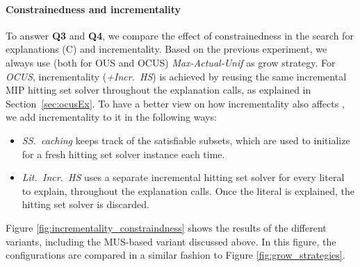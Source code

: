 \paragraph{Constrainedness and incrementality}
To answer \textbf{Q3} and \textbf{Q4}, we compare the effect of constrainedness in the search for explanations (C) and incrementality. Based on the previous experiment, we always use (both for OUS and OCUS) \emph{Max-Actual-Unif} as grow strategy.
For \emph{OCUS}, incrementality (\emph{+Incr.~HS}) is achieved by reusing the same incremental MIP hitting set solver throughout the explanation calls, as explained in Section~\ref{sec:ocusEx}.  
To have a better view on how incrementality also affects \omus, we add incrementality to it in the following ways:
\begin{itemize}
	\item \emph{SS.~caching} keeps track of the satisfiable subsets, which are used to initialize \setstohit for a fresh hitting set solver instance each time.
	\item \emph{Lit.~Incr.~HS} uses a separate incremental hitting set solver for every literal to explain, throughout the explanation calls. Once the literal is explained, the hitting set solver is discarded.
\end{itemize}
% 
Figure \ref{fig:incrementality_constraindness} shows the results of the different variants, including the MUS-based variant discussed above. 
In this figure, the configurations are compared in a similar fashion to Figure \ref{fig:grow_strategies}.

